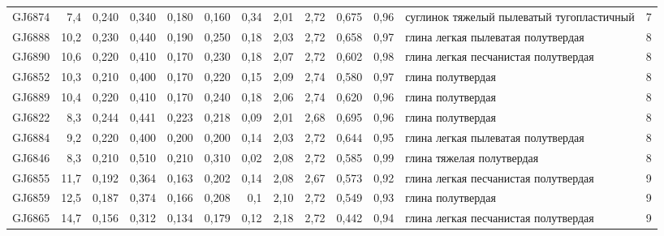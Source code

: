 \begin{sidewaystable}[p]
\begin{tabular}{@{}lrrrrrrrrrrlc@{}}
    GJ6874          & 7,4        & 0,240                        & 0,340   & 0,180  & 0,160  & 0,34     & 2,01     & 2,72      & 0,675   & 0,96     & суглинок тяжелый   пылеватый тугопластичный  & 7   \\ 
    GJ6888          & 10,2       & 0,230                        & 0,440   & 0,190  & 0,250  & 0,18     & 2,03     & 2,72      & 0,658   & 0,97     & глина легкая   пылеватая полутвердая         & 8   \\ 
    GJ6890          & 10,6       & 0,220                        & 0,410   & 0,170  & 0,230  & 0,18     & 2,07     & 2,72      & 0,602   & 0,98     & глина легкая   песчанистая полутвердая       & 8   \\ 
    GJ6852          & 10,3       & 0,210                        & 0,400   & 0,170  & 0,220  & 0,15     & 2,09     & 2,74      & 0,580   & 0,97     & глина полутвердая                            & 8   \\ 
    GJ6889          & 10,4       & 0,220                        & 0,410   & 0,170  & 0,240  & 0,18     & 2,06     & 2,74      & 0,620   & 0,96     & глина полутвердая                            & 8   \\ 
    GJ6822          & 8,3        & 0,244                        & 0,441   & 0,223  & 0,218  & 0,09     & 2,01     & 2,68      & 0,695   & 0,96     & глина полутвердая                            & 8   \\ 
    GJ6884          & 9,2        & 0,220                        & 0,400   & 0,200  & 0,200  & 0,14     & 2,03     & 2,72      & 0,644   & 0,95     & глина легкая   пылеватая полутвердая         & 8   \\ 
    GJ6846          & 8,3        & 0,210                        & 0,510   & 0,210  & 0,310  & 0,02     & 2,08     & 2,72      & 0,585   & 0,99     & глина тяжелая   полутвердая                  & 8   \\ 
    GJ6855          & 11,7       & 0,192                        & 0,364   & 0,163  & 0,202  & 0,14     & 2,08     & 2,67      & 0,573   & 0,92     & глина легкая   песчанистая полутвердая       & 9   \\ 
    GJ6859          & 12,5       & 0,187                        & 0,374   & 0,166  & 0,208  & 0,1      & 2,10     & 2,72      & 0,549   & 0,93     & глина полутвердая                            & 9   \\ 
    GJ6865          & 14,7       & 0,156                        & 0,312   & 0,134  & 0,179  & 0,12     & 2,18     & 2,72      & 0,442   & 0,94     & глина легкая   песчанистая полутвердая       & 9   \\ 

\end{tabular}
\end{sidewaystable}
